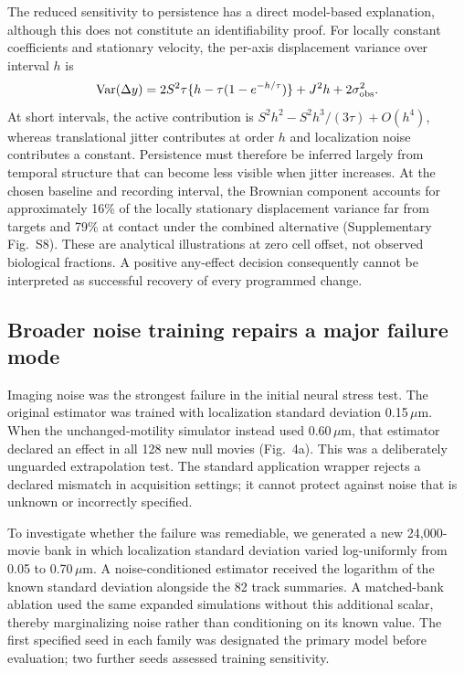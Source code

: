 \documentclass[12pt]{article}
\begin{document}
The reduced sensitivity to persistence has a direct model-based explanation, although this does not constitute an identifiability proof. For locally constant coefficients and stationary velocity, the per-axis displacement variance over interval $h$ is
\begin{equation}
\operatorname{Var}(\Delta y)=2S^2\tau\{h-\tau(1-e^{-h/\tau})\}+J^2h+2\sigma_{\rm obs}^2.
\end{equation}
At short intervals, the active contribution is $S^2h^2-S^2h^3/(3\tau)+O(h^4)$, whereas translational jitter contributes at order $h$ and localization noise contributes a constant. Persistence must therefore be inferred largely from temporal structure that can become less visible when jitter increases. At the chosen baseline and recording interval, the Brownian component accounts for approximately 16\% of the locally stationary displacement variance far from targets and 79\% at contact under the combined alternative (Supplementary Fig.~S8). These are analytical illustrations at zero cell offset, not observed biological fractions. A positive any-effect decision consequently cannot be interpreted as successful recovery of every programmed change.

\subsection*{Broader noise training repairs a major failure mode}
Imaging noise was the strongest failure in the initial neural stress test. The original estimator was trained with localization standard deviation 0.15\,$\mu$m. When the unchanged-motility simulator instead used 0.60\,$\mu$m, that estimator declared an effect in all 128 new null movies (Fig.~4a). This was a deliberately unguarded extrapolation test. The standard application wrapper rejects a declared mismatch in acquisition settings; it cannot protect against noise that is unknown or incorrectly specified.

To investigate whether the failure was remediable, we generated a new 24,000-movie bank in which localization standard deviation varied log-uniformly from 0.05 to 0.70\,$\mu$m. A noise-conditioned estimator received the logarithm of the known standard deviation alongside the 82 track summaries. A matched-bank ablation used the same expanded simulations without this additional scalar, thereby marginalizing noise rather than conditioning on its known value. The first specified seed in each family was designated the primary model before evaluation; two further seeds assessed training sensitivity.
\end{document}
